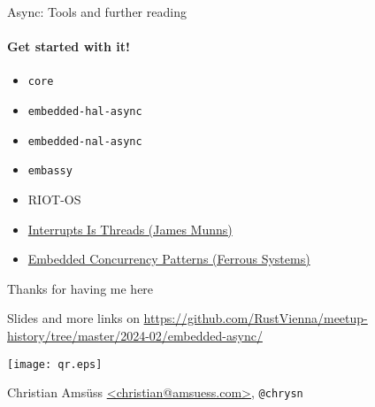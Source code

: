 \documentclass[aspectratio=169]{beamer}
\begin{document}
\begin{frame}[fragile]{Async: Tools and further reading}\Large
\framesubtitle{Get started with it!}
  \begin{itemize}
    \item \texttt{core}
    \item \texttt{embedded-hal-async}
    \item \texttt{embedded-nal-async}
    \item \texttt{embassy}
    \item RIOT-OS
  \end{itemize}

  \bigskip

  \begin{itemize}
    \item \href{https://onevariable.com/blog/interrupts-is-threads/}{Interrupts Is Threads (James Munns)}
    \item \href{https://ferrous-systems.com/blog/embedded-concurrency-patterns/}{Embedded Concurrency Patterns (Ferrous Systems)}
  \end{itemize}
\end{frame}

\begin{frame}{}\large
    Thanks for having me here

    \vspace{1cm}

    Slides and more links on \url{https://github.com/RustVienna/meetup-history/tree/master/2024-02/embedded-async/}

    \bigskip
    \center \texttt{[image: qr.eps]}

    \bigskip

    \hfill Christian Amsüss \url{<christian@amsuess.com>}, \texttt{@chrysn}
\end{frame}\Large
\end{document}
